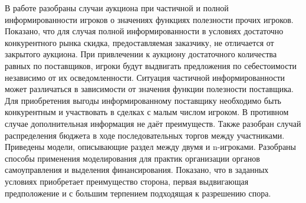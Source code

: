 В работе разобраны случаи аукциона при частичной и полной информированности игроков о значениях функциях полезности прочих игроков. Показано, что для случая полной информированности  в условиях достаточно конкурентного рынка скидка, предоставляемая заказчику, не отличается от закрытого аукциона. При привлечении к аукциону достаточного количества равных по  поставщиков, игроки будут выдвигать предложения по себестоимости независимо от их осведомленности. Ситуация частичной информированности может различаться в зависимости от значения функции полезности поставщика. Для приобретения выгоды информированному поставщику необходимо быть конкурентным и участвовать в сделках с малым числом игроком. В противном случае дополнительная информация не даёт преимуществ. Также разобран случай распределения бюджета в ходе последовательных торгов между участниками. Приведены модели, описывающие раздел между двумя и n-игроками. Разобраны способы применения моделирования для практик организации органов самоуправления и выделения финансирования. Показано, что в заданных условиях приобретает преимущество сторона, первая выдвигающая предположение и с большим терпением подходящая к разрешению спора. 